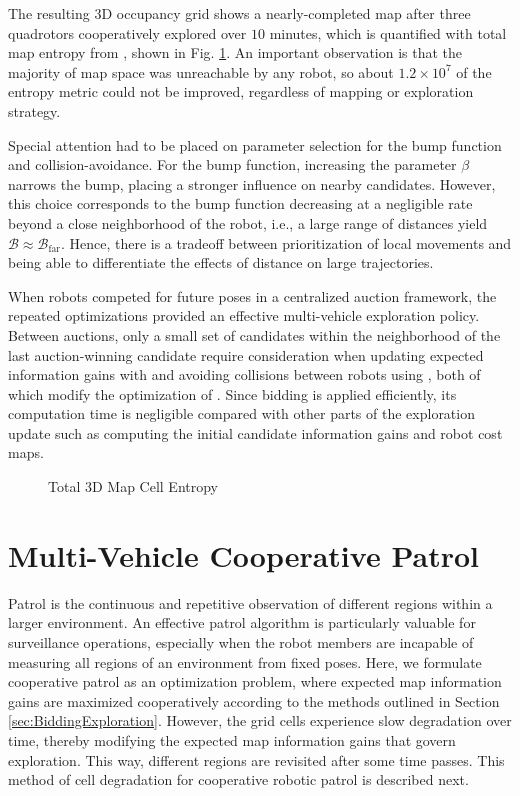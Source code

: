 	
	
The resulting 3D occupancy grid shows a nearly-completed map after three quadrotors cooperatively explored over $10$ minutes, which is quantified with total map entropy from , shown in Fig. \ref{fig:simH}. An important observation is that the majority of map space was unreachable by any robot, so about $1.2\times10^7$ of the entropy metric could not be improved, regardless of mapping or exploration strategy.

Special attention had to be placed on parameter selection for the bump function and collision-avoidance. For the bump function, increasing the parameter $\beta$ narrows the bump, placing a stronger influence on nearby candidates. However, this choice corresponds to the bump function decreasing at a negligible rate beyond a close neighborhood of the robot, i.e., a large range of distances yield $\mathcal B\approx\mathcal B_\text{far}$. Hence, there is a tradeoff between prioritization of local movements and being able to differentiate the effects of distance on large trajectories.

When robots competed for future poses in a centralized auction framework, the repeated optimizations provided an effective multi-vehicle exploration policy. Between auctions, only a small set of candidates within the neighborhood of the last auction-winning candidate require consideration when updating expected information gains with  and avoiding collisions between robots using , both of which modify the optimization of . Since bidding is applied efficiently, its computation time is negligible compared with other parts of the exploration update such as computing the initial candidate information gains and robot cost maps.

	\begin{figure}
		\caption{Total 3D Map Cell Entropy}
		\label{fig:simH}
	\end{figure}





\section{Multi-Vehicle Cooperative Patrol}


Patrol is the continuous and repetitive observation of different regions within a larger environment. An effective patrol algorithm is particularly valuable for surveillance operations, especially when the robot members are incapable of measuring all regions of an environment from fixed poses. Here, we formulate cooperative patrol as an optimization problem, where expected map information gains are maximized cooperatively according to the methods outlined in Section \ref{sec:BiddingExploration}. However, the grid cells experience slow degradation over time, thereby modifying the expected map information gains that govern exploration. This way, different regions are revisited after some time passes. This method of cell degradation for cooperative robotic patrol is described next.

